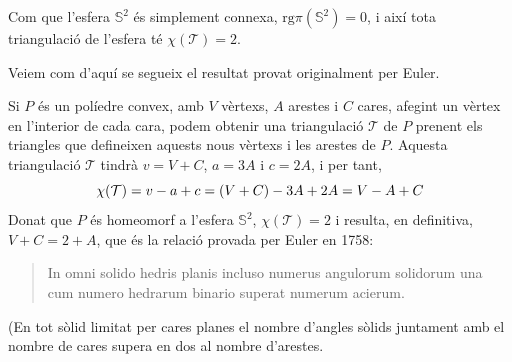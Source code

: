 \documentclass[../main.tex]{subfiles}
\begin{document}
\begin{ej}
\label{ej:caracteristicaeuleresfera} Com que l'esfera $\mathbb{S}^2$ és simplement connexa, $\mathrm{rg}\pi(\mathbb{S}^2)=0$, i així tota triangulació de l'esfera té $\chi(\mathcal{T})=2$.

Veiem com d'aquí se segueix el resultat provat originalment per Euler. 

Si $P$ és un políedre convex, amb $V$ vèrtexs, $A$ arestes i $C$ cares, afegint un vèrtex en l'interior de cada cara, podem obtenir una triangulació $\mathcal{T}$ de $P$ prenent els triangles que defineixen aquests nous vèrtexs i les arestes de $P$. Aquesta triangulació $\mathcal{T}$ tindrà $v = V+C$, $a = 3A$ i $c = 2A$, i per tant,
\begin{equation}
    \notag
    \chi(\mathcal{T}) = v-a+c = (V+C)-3A+2A = V-A+C
\end{equation}
Donat que $P$ és homeomorf a l'esfera $\mathbb{S}^2$, $\chi(\mathcal{T})=2$ i resulta, en definitiva, $V+C = 2+A$, que és la relació provada per Euler en 1758:
\begin{quote}
    \guillemotleft In omni solido hedris planis incluso numerus angulorum solidorum una cum numero hedrarum binario superat numerum acierum.\guillemotright
\end{quote}
(En tot sòlid limitat per cares planes el nombre d'angles sòlids juntament amb el nombre de cares supera en dos al nombre d'arestes.
\end{ej}
\end{document}
